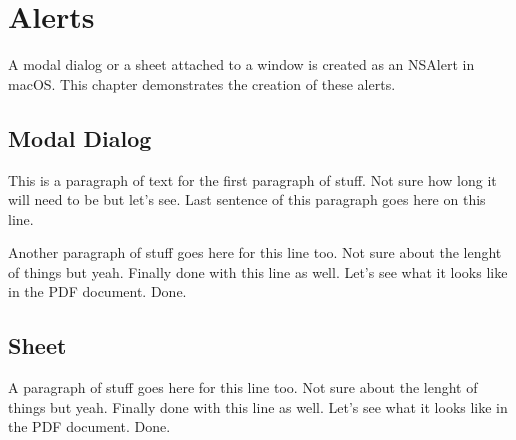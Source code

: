 \chapter{Alerts}

A modal dialog or a sheet attached to a window is created as an NSAlert in macOS. This chapter demonstrates the creation of these alerts.

\section{Modal Dialog}

This is a paragraph of text for the first paragraph of stuff. Not sure how long it will need to be but let's see. Last sentence of this paragraph goes here on this line.

Another paragraph of stuff goes here for this line too. Not sure about the lenght of things but yeah. Finally done with this line as well. Let's see what it looks like in the PDF document. Done.

\section{Sheet}

A paragraph of stuff goes here for this line too. Not sure about the lenght of things but yeah. Finally done with this line as well. Let's see what it looks like in the PDF document. Done.
